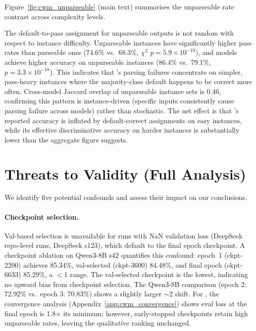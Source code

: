 Figure~\ref{fig:cwm_unparseable} (main text) summarises the unparseable rate contrast across complexity levels.

The default-to-pass assignment for unparseable \cwm{} outputs is not random with respect to instance difficulty. Unparseable instances have significantly higher pass rates than parseable ones (74.6\% vs.\ 68.3\%, $\chi^2$ $p = 5.9 \times 10^{-10}$), and \cls{} models achieve higher accuracy on unparseable instances (86.4\% vs.\ 79.1\%, $p = 3.3 \times 10^{-18}$). This indicates that \cwm{}'s parsing failures concentrate on simpler, pass-heavy instances where the majority-class default happens to be correct more often. Cross-model Jaccard overlap of unparseable instance sets is 0.46, confirming this pattern is instance-driven (specific inputs consistently cause parsing failure across models) rather than stochastic. The net effect is that \cwm{}'s reported accuracy is inflated by default-correct assignments on easy instances, while its effective discriminative accuracy on harder instances is substantially lower than the aggregate figure suggests.


\section{Threats to Validity (Full Analysis)}
\label{app:threats}

We identify five potential confounds and assess their impact on our conclusions.

\paragraph{Checkpoint selection.} Val-based selection is unavailable for runs with NaN validation loss (DeepSeek \cwm{} repo-level runs, DeepSeek \cls{} s123), which default to the final epoch checkpoint. A checkpoint ablation on Qwen3-8B \cls{} s42 quantifies this confound: epoch~1 (ckpt-2200) achieves 85.34\%, val-selected (ckpt-3600) 84.48\%, and final epoch (ckpt-6633) 85.29\%, a $<$1\pp{} range. The val-selected checkpoint is the lowest, indicating no upward bias from checkpoint selection. The Qwen3-8B \traj{} comparison (epoch 2: 72.92\% vs.\ epoch 3: 70.83\%) shows a slightly larger ${\sim}$2\pp{} shift. For \cwm{}, the convergence analysis (Appendix~\ref{app:cwm_convergence}) shows eval loss at the final epoch is 1.8$\times$ its minimum; however, early-stopped checkpoints retain high unparseable rates, leaving the qualitative ranking unchanged.

